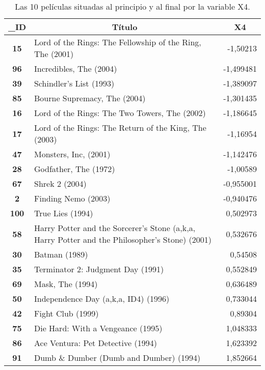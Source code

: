 \documentclass{uimppracticas}
\begin{document}
\begin{table}[h]
	\centering
	\begin{tabular}{|c|l|r|}
		\hline
		\textbf{\_ID} & \multicolumn{1}{c|}{\textbf{Título}}                      & \multicolumn{1}{c|}{\textbf{X4}} \\ \hline
		\textbf{15}   & Lord of the Rings: The Fellowship of the Ring, The (2001) & -1,50213                         \\ \hline
		\textbf{96} & Incredibles, The (2004)      & -1,499481 \\ \hline
		\textbf{39} & Schindler's List (1993)      & -1,389097 \\ \hline
		\textbf{85} & Bourne Supremacy, The (2004) & -1,301435 \\ \hline
		\textbf{16}   & Lord of the Rings: The Two Towers, The (2002)             & -1,186645                        \\ \hline
		\textbf{17}   & Lord of the Rings: The Return of the King, The (2003)     & -1,16954                         \\ \hline
		\textbf{47} & Monsters, Inc, (2001)        & -1,142476 \\ \hline
		\textbf{28} & Godfather, The (1972)        & -1,00589  \\ \hline
		\textbf{67} & Shrek 2 (2004)               & -0,955001 \\ \hline
		\textbf{2}  & Finding Nemo (2003)          & -0,940476 \\ \hline
		\hline
		\textbf{100} & True Lies (1994)                        & 0,502973 \\ \hline
		\textbf{58}   & Harry Potter and the Sorcerer's Stone (a,k,a, Harry Potter and the   Philosopher's Stone) (2001) & 0,532676                         \\ \hline
		\textbf{30}  & Batman (1989)                           & 0,54508  \\ \hline
		\textbf{35}  & Terminator 2: Judgment Day (1991)       & 0,552849 \\ \hline
		\textbf{69}  & Mask, The (1994)                        & 0,636489 \\ \hline
		\textbf{50}  & Independence Day (a,k,a, ID4) (1996)    & 0,733044 \\ \hline
		\textbf{42}  & Fight Club (1999)                       & 0,89304  \\ \hline
		\textbf{75}  & Die Hard: With a Vengeance (1995)       & 1,048333 \\ \hline
		\textbf{86}  & Ace Ventura: Pet Detective (1994)       & 1,623392 \\ \hline
		\textbf{91}  & Dumb \& Dumber (Dumb and Dumber) (1994) & 1,852664 \\ \hline
	\end{tabular}
	\caption{Las 10 películas situadas al principio y al final por la variable X4.}
	\label{X4_principio}
\end{table}
\end{document}
